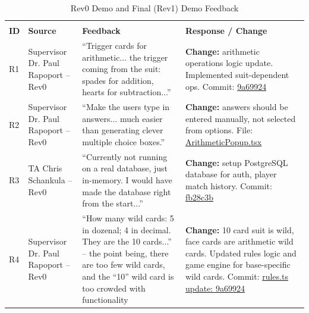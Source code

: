\documentclass{article}
\begin{document}
\begin{longtable}{p{} p{} p{} p{}}\\
\toprule
\caption{Rev0 Demo and Final (Rev1) Demo Feedback}\\
\textbf{ID} & \textbf{Source} & \textbf{Feedback} & \textbf{Response / Change} \\
\midrule
\endhead
\bottomrule
\endfoot

R1 & Supervisor Dr. Paul Rapoport -- Rev0 & ``Trigger cards for arithmetic... the trigger coming from the suit: spades for addition, hearts for subtraction...'' & \textbf{Change:} arithmetic operations logic update. Implemented suit-dependent ops. \newline Commit: \href{https://github.com/The-Crazy-Four-Games/Crazy_1-0s_Game/commit/9a699247e6bf1f620313afaf260f7583fa7f78f8}{9a69924} \\
\midrule

R2 & Supervisor Dr. Paul Rapoport -- Rev0 & ``Make the users type in answers... much easier than generating clever multiple choice boxes.'' & \textbf{Change:} answers should be entered manually, not selected from options. \newline File: \href{https://github.com/The-Crazy-Four-Games/Crazy_1-0s_Game/blob/3bb9a8bdc77078b73548373c7f37b51bbb2c6f6f/src/components/ArithmeticPopup.tsx}{ArithmeticPopup.tsx} \\
\midrule

R3 & TA Chris Schankula -- Rev0 & ``Currently not running on a real database, just in-memory. I would have made the database right from the start...'' & \textbf{Change:} setup PostgreSQL database for auth, player match history. \newline Commit: \href{https://github.com/The-Crazy-Four-Games/Crazy_1-0s_Game/commit/fb28c3b87b813e39ed40b9ea22af8be98762e0f1}{fb28c3b} \\
\midrule

R4 & Supervisor Dr. Paul Rapoport -- Rev0 & ``How many wild cards: 5 in dozenal; 4 in decimal. They are the 10 cards...'' -- the point being, there are too few wild cards, and the ``10'' wild card is too crowded with functionality& \textbf{Change:} 10 card suit is wild, face cards are arithmetic wild cards. Updated rules logic and game engine for base-specific wild cards. \newline Commit: \href{https://github.com/The-Crazy-Four-Games/Crazy_1-0s_Game/commit/9a699247e6bf1f620313afaf260f7583fa7f78f8}{rules.ts update: 9a69924} \\
\midrule


\end{longtable}
\end{document}
